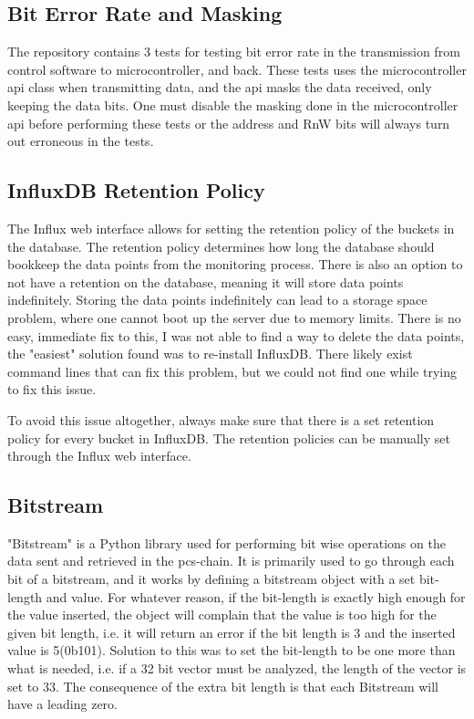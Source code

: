 \documentclass[main.tex]{subfiles}
\begin{document}
\subsection{Bit Error Rate and Masking}

The repository contains 3 tests for testing bit error rate in the transmission from control software to microcontroller, and back. These tests uses the microcontroller \gls{api} class when transmitting data, and the \gls{api} masks the data received, only keeping the data bits. One must disable the masking done in the microcontroller \gls{api} before performing these tests or the address and RnW bits will always turn out erroneous in the tests.


\subsection{InfluxDB Retention Policy}

The Influx web interface allows for setting the retention policy of the buckets in the database. The retention policy determines how long the database should bookkeep the data points from the monitoring process. There is also an option to not have a retention on the database, meaning it will store data points indefinitely. Storing the data points indefinitely can lead to a storage space problem, where one cannot boot up the server due to memory limits. There is no easy, immediate fix to this, I was not able to find a way to delete the data points, the "easiest" solution found was to re-install InfluxDB. There likely exist command lines that can fix this problem, but we could not find one while trying to fix this issue.

To avoid this issue altogether, always make sure that there is a set retention policy for every bucket in InfluxDB. The retention policies can be manually set through the Influx web interface.

\subsection{Bitstream}

"Bitstream" is a Python library used for performing bit wise operations on the data sent and retrieved in the \gls{pcs}-chain. It is primarily used to go through each bit of a bitstream, and it works by defining a bitstream object with a set bit-length and value. For whatever reason, if the bit-length is exactly high enough for the value inserted, the object will complain that the value is too high for the given bit length, i.e. it will return an error if the bit length is 3 and the inserted value is 5(0b101). Solution to this was to set the bit-length to be one more than what is needed, i.e. if a 32 bit vector must be analyzed, the length of the vector is set to 33. The consequence of the extra bit length is that each Bitstream will have a leading zero.
\end{document}
